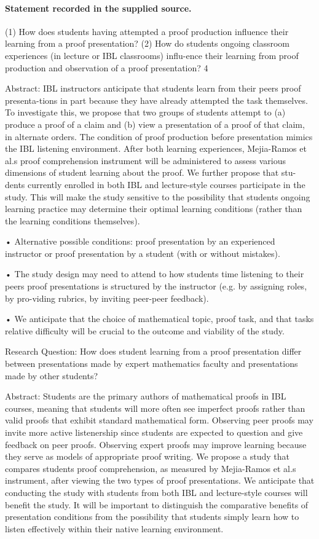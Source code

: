 \documentclass[11pt]{article}
\begin{document}
\paragraph{Statement recorded in the supplied source.}
(1) How does students having attempted a proof production influence their learning from a proof presentation? (2) How do students ongoing classroom experiences (in lecture or IBL classrooms) influ-ence their learning from proof production and observation of a proof presentation? 4

Abstract: IBL instructors anticipate that students learn from their peers proof presenta-tions in part because they have already attempted the task themselves. To investigate this, we propose that two groups of students attempt to (a) produce a proof of a claim and (b) view a presentation of a proof of that claim, in alternate orders. The condition of proof production before presentation mimics the IBL listening environment. After both learning experiences, Mejia-Ramos et al.s proof comprehension instrument will be administered to assess various dimensions of student learning about the proof. We further propose that stu-dents currently enrolled in both IBL and lecture-style courses participate in the study. This will make the study sensitive to the possibility that students ongoing learning practice may determine their optimal learning conditions (rather than the learning conditions themselves).

• Alternative possible conditions: proof presentation by an experienced instructor or proof presentation by a student (with or without mistakes).

• The study design may need to attend to how students time listening to their peers proof presentations is structured by the instructor (e.g. by assigning roles, by pro-viding rubrics, by inviting peer-peer feedback).

• We anticipate that the choice of mathematical topic, proof task, and that tasks relative difficulty will be crucial to the outcome and viability of the study.

Research Question: How does student learning from a proof presentation differ between presentations made by expert mathematics faculty and presentations made by other students?

Abstract: Students are the primary authors of mathematical proofs in IBL courses, meaning that students will more often see imperfect proofs rather than valid proofs that exhibit standard mathematical form. Observing peer proofs may invite more active listenership since students are expected to question and give feedback on peer proofs. Observing expert proofs may improve learning because they serve as models of appropriate proof writing. We propose a study that compares students proof comprehension, as measured by Mejia-Ramos et al.s instrument, after viewing the two types of proof presentations. We anticipate that conducting the study with students from both IBL and lecture-style courses will benefit the study. It will be important to distinguish the comparative benefits of presentation conditions from the possibility that students simply learn how to listen effectively within their native learning environment.
\end{document}
